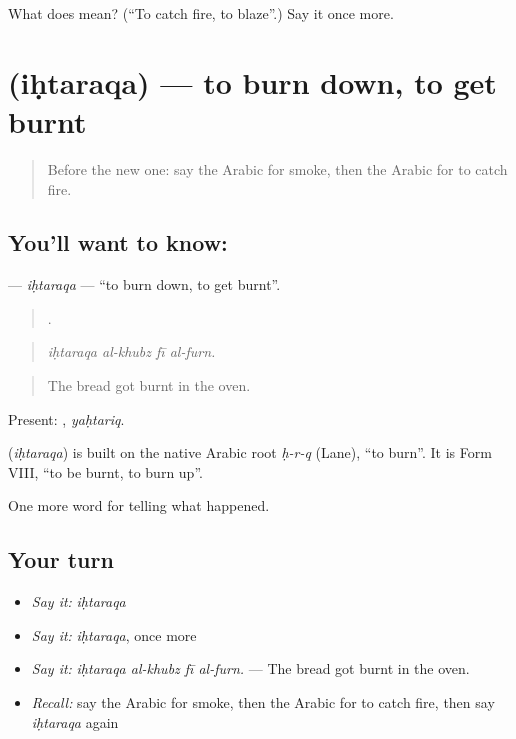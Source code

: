 \begin{tcolorbox}[breakable,colback=teal!4,colframe=teal!35!black,title={Before you move on}]
What does  mean? (\textquotedblleft{}To catch fire, to blaze\textquotedblright{}.) Say it once more.
\end{tcolorbox}
\section[\texorpdfstring{\ar{احترق} (iḥtaraqa)}{احترق (iḥtaraqa)}]{ (iḥtaraqa) — to burn down, to get burnt}

\label{lesson:AR-C298-ihtaraqa}



\begin{quote}
Before the new one: say the Arabic for smoke, then the Arabic for to catch fire.
\end{quote}

\subsection*{You'll want to know: }
\textbf{} — \emph{iḥtaraqa} — \textquotedblleft{}to burn down, to get burnt\textquotedblright{}.

\begin{quote}
   .
\end{quote}

\begin{quote}
\emph{iḥtaraqa al-khubz fī al-furn.}
\end{quote}

\begin{quote}
The bread got burnt in the oven.
\end{quote}

Present: , \emph{yaḥtariq}.

\begin{cousinweb}
\textbf{} (\emph{iḥtaraqa}) is built on the native Arabic root \emph{ḥ-r-q} (Lane), \textquotedblleft{}to burn\textquotedblright{}. It is Form VIII, \textquotedblleft{}to be burnt, to burn up\textquotedblright{}.
\end{cousinweb}

\begin{grammarlens}[title={What you've built}]
One more word for telling what happened.
\end{grammarlens}

\subsection*{Your turn}
\begin{itemize}
\raggedright
  \item \emph{Say it:} \emph{iḥtaraqa}
  \item \emph{Say it:} \emph{iḥtaraqa}, once more
  \item \emph{Say it:} \emph{iḥtaraqa al-khubz fī al-furn.} — The bread got burnt in the oven.
  \item \emph{Recall:} say the Arabic for smoke, then the Arabic for to catch fire, then say \emph{iḥtaraqa} again
\end{itemize}

